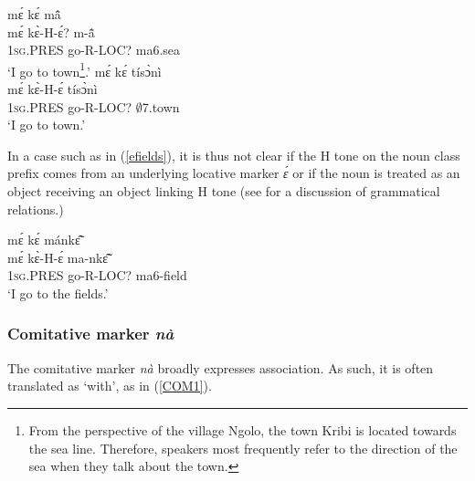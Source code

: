 \begin{exe}
\ex\label{totown}
\begin{xlist}
\ex\label{totown1}
  \glll    mɛ́ kɛ́ mã̂\\
          mɛ́ kɛ̀-H-ɛ́? m-ã̂\\
              1\textsc{sg}.PRES go-R-LOC? ma6.sea \\
    \trans `I go to town\footnote{From the perspective of the village Ngolo, the town Kribi is located towards the sea line. Therefore, speakers most frequently refer to the direction of the sea when they talk about the town.}.'
\ex\label{totown2}
  \glll    mɛ́ kɛ́ tísɔ̀nì\\
         mɛ́ kɛ̀-H-ɛ́ tísɔ̀nì\\
              1\textsc{sg}.PRES go-R-LOC? $\emptyset$7.town \\
    \trans `I go to town.'
\end{xlist}
\end {exe}

In a case such as in (\ref{efields}), it is thus not clear if the H tone on the noun class prefix comes from an underlying locative marker {\itshape ɛ́} or if the noun is treated as an object receiving an object linking H tone (see  for a discussion of grammatical relations.)

\begin{exe}
\ex\label{efields}
  \glll    mɛ́ kɛ́ mánkɛ̃̂\\
         mɛ́ kɛ̀-H-ɛ́ ma-nkɛ̃̂\\
              1\textsc{sg}.PRES go-R-LOC? ma6-field \\
    \trans `I go to the fields.'
\end {exe}





\subsubsection{Comitative marker {\itshape nà}}
\label{sec:COM}

The comitative marker {\itshape nà} broadly expresses association.  As such, it is often translated as `with', as in (\ref{COM1}).

